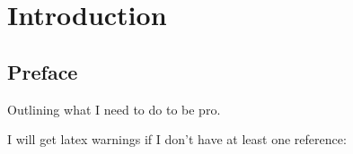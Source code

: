 \chapter[Introduction]
{Introduction
  \label{ch0introduction}}

\section{Preface}

Outlining what I need to do to be pro.

I will get latex warnings if I don't have at least one reference:
\cite{wiki_templatecpp}
